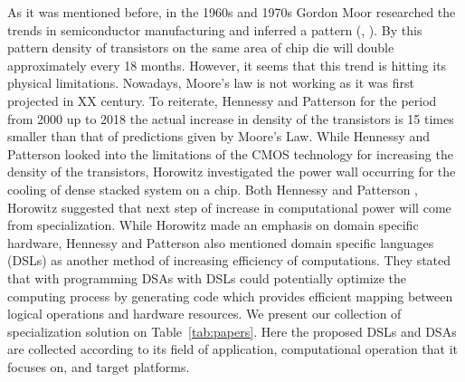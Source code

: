 \documentclass[conference]{IEEEtran}
\begin{document}
As it was mentioned before, in the 1960s and 1970s Gordon Moor researched the trends in semiconductor manufacturing and inferred a pattern (\cite{ref18}, \cite{ref19}). By this pattern density of transistors on the same area of chip die will double approximately every 18 months. However, it seems that this trend is hitting its physical limitations. Nowadays, Moore's law is not working as it was first projected in XX century. To reiterate, Hennessy and Patterson \cite{ref21} for the period from 2000 up to 2018 the actual increase in density of the transistors is 15 times smaller than that of predictions given by Moore's Law. While Hennessy and Patterson \cite{ref21} looked into the limitations of the CMOS technology for increasing the density of the transistors, Horowitz \cite{ref20} investigated the power wall occurring for the cooling of dense stacked system on a chip. Both Hennessy and Patterson \cite{ref21}, Horowitz \cite{ref20} suggested that next step of increase in computational power will come from specialization. While Horowitz \cite{ref20} made an emphasis on domain specific hardware, Hennessy and Patterson \cite{ref21} also mentioned domain specific languages (DSLs) as another method of increasing efficiency of computations. They stated that with programming DSAs with DSLs could potentially optimize the computing process by generating code which provides efficient mapping between logical operations and hardware resources. We present our collection of specialization solution on Table~\ref{tab:papers}. Here the proposed DSLs and DSAs are collected according to its field of application, computational operation that it focuses on, and target platforms.     
\end{document}
